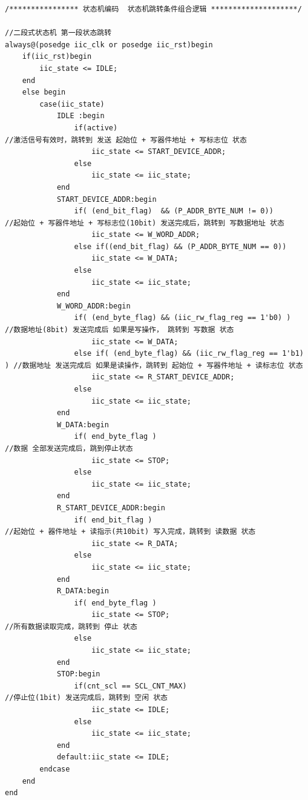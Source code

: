 \documentclass[a4paper,10pt]{article}
\begin{document}
\begin{lstlisting}[caption=iic_drive.v]
/**************** 状态机编码  状态机跳转条件组合逻辑 ********************/

//二段式状态机 第一段状态跳转 
always@(posedge iic_clk or posedge iic_rst)begin
    if(iic_rst)begin
        iic_state <= IDLE;
    end
    else begin
        case(iic_state)
            IDLE :begin
                if(active)                                             //激活信号有效时，跳转到 发送 起始位 + 写器件地址 + 写标志位 状态
                    iic_state <= START_DEVICE_ADDR;
                else 
                    iic_state <= iic_state;
            end
            START_DEVICE_ADDR:begin 
                if( (end_bit_flag)  && (P_ADDR_BYTE_NUM != 0))          //起始位 + 写器件地址 + 写标志位(10bit) 发送完成后，跳转到 写数据地址 状态  
                    iic_state <= W_WORD_ADDR;
                else if((end_bit_flag) && (P_ADDR_BYTE_NUM == 0))
                    iic_state <= W_DATA;
                else 
                    iic_state <= iic_state;
            end
            W_WORD_ADDR:begin
                if( (end_byte_flag) && (iic_rw_flag_reg == 1'b0) )      //数据地址(8bit) 发送完成后 如果是写操作， 跳转到 写数据 状态
                    iic_state <= W_DATA;
                else if( (end_byte_flag) && (iic_rw_flag_reg == 1'b1) ) //数据地址 发送完成后 如果是读操作，跳转到 起始位 + 写器件地址 + 读标志位 状态
                    iic_state <= R_START_DEVICE_ADDR;
                else 
                    iic_state <= iic_state;
            end
            W_DATA:begin
                if( end_byte_flag )                                    //数据 全部发送完成后，跳到停止状态
                    iic_state <= STOP;
                else 
                    iic_state <= iic_state;
            end
            R_START_DEVICE_ADDR:begin
                if( end_bit_flag )                                     //起始位 + 器件地址 + 读指示(共10bit) 写入完成，跳转到 读数据 状态 
                    iic_state <= R_DATA;
                else 
                    iic_state <= iic_state;    
            end
            R_DATA:begin
                if( end_byte_flag )
                    iic_state <= STOP;                                //所有数据读取完成，跳转到 停止 状态
                else 
                    iic_state <= iic_state;
            end
            STOP:begin 
                if(cnt_scl == SCL_CNT_MAX)                            //停止位(1bit) 发送完成后，跳转到 空闲 状态 
                    iic_state <= IDLE;
                else
                    iic_state <= iic_state;
            end
            default:iic_state <= IDLE;
        endcase
    end
end


\end{lstlisting}
\end{document}

